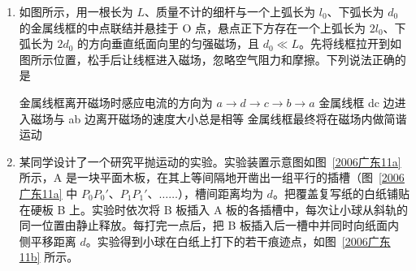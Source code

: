 \documentclass[\gkver]{gaokaozhenti}
\begin{document}
\begin{enumerate}
{电磁波是由恒定不变的电场或磁场产生的}
{测出从发射电磁波到接收反射波的时间间隔可以确定雷达和目标的距离}
{波长越短的电磁波，反射性能越强}


\item
如图所示，用一根长为 $L$、质量不计的细杆与一个上弧长为 $l_{0}$、下弧长为 $d_{0}$ 的金属线框的中点联结并悬挂于 O 点，悬点正下方存在一个上弧长为 $2l_{0}$、下弧长为 $2d_{0}$ 的方向垂直纸面向里的匀强磁场，且 $d_{0}\ll L$。先将线框拉开到如图所示位置，松手后让线框进入磁场，忽略空气阻力和摩擦。下列说法正确的是


{金属线框离开磁场时感应电流的方向为 $a\to d\to c\to b\to a$}
{金属线框 dc 边进入磁场与 ab 边离开磁场的速度大小总是相等}
{金属线框最终将在磁场内做简谐运动}


\item
某同学设计了一个研究平抛运动的实验。实验装置示意图如图~\ref{2006广东11a} 所示，A 是一块平面木板，在其上等间隔地开凿出一组平行的插槽（图~\ref{2006广东11a} 中 $P_{0}P_{0}'$、$P_{1}P_{1}'$、$\ldots\ldots$），槽间距离均为 $d$。把覆盖复写纸的白纸铺贴在硬板 B 上。实验时依次将 B 板插入 A 板的各插槽中，每次让小球从斜轨的同一位置由静止释放。每打完一点后，把 B 板插入后一槽中并同时向纸面内侧平移距离 $d$。实验得到小球在白纸上打下的若干痕迹点，如图~\ref{2006广东11b} 所示。


\end{enumerate}
\end{document}
